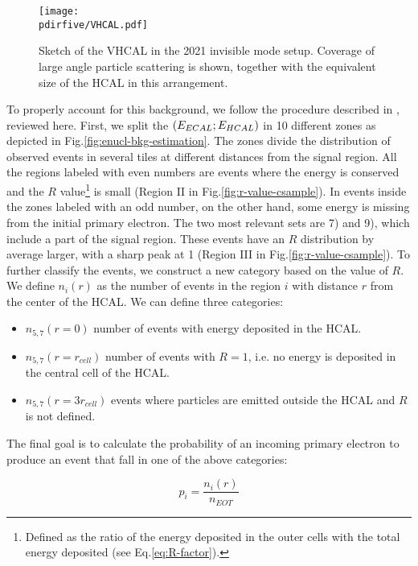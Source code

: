 \begin{figure}[bth!]
  \centering
  \texttt{[image: \\pdirfive/VHCAL.pdf]}
  \caption[Sketch of VHCAL in invisible mode setup 2021]{Sketch of the VHCAL in the 2021 invisible mode setup. Coverage of large angle particle scattering is shown, together with the equivalent size of the HCAL in this arrangement.}
  \label{fig:vhcal}
\end{figure}

To properly account for this background, we follow the procedure described in \cite{na64-neutrals-study,pdegen-thesis}, reviewed here.
First, we split the $(E_{ECAL};E_{HCAL})$ in 10 different zones as depicted in Fig.\ref{fig:enucl-bkg-estimation}. The zones divide the distribution of observed events in several tiles at different distances from the signal region. All the regions labeled with even numbers are events where the energy is conserved and the $R$ value\footnote{Defined as the ratio of the energy deposited in the outer cells with the total energy deposited (see Eq.\ref{eq:R-factor}).} is small (Region II in Fig.\ref{fig:r-value-csample}). In events inside the zones labeled with an odd number, on the other hand, some energy is missing from the initial primary electron. The two most relevant sets are 7) and 9), which include a part of the signal region. These events have an $R$ distribution by average larger, with a sharp peak at 1 (Region III in Fig.\ref{fig:r-value-csample}). To further classify the events, we construct a new category based on the value of $R$. We define $n_i(r)$ as the number of events in the region $i$ with distance $r$ from the center of the HCAL. We can define three categories:

\begin{itemize}
\item $n_{5,7}(r=0)$ number of events with energy deposited in the HCAL.
\item $n_{5,7}(r=r_{cell})$ number of events with $R=1$, i.e. no energy is deposited in the central cell of the HCAL.
\item $n_{5,7}(r=3r_{cell})$ events where particles are emitted outside the HCAL and $R$ is not defined.
\end{itemize}

The final goal is to calculate the probability of an incoming primary electron to produce an event that fall in one of the above categories:

\begin{equation}
  \label{eq:enucl-prob}
  p_i = \frac{n_i(r)}{n_{EOT}}
\end{equation}

